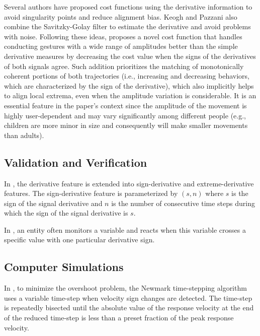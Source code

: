 \documentclass[11pt]{book}
\begin{document}
Several authors have proposed cost functions using the derivative
information to avoid singularity points and reduce alignment bias.
Keogh and Pazzani also combine the Savitzky-Golay filter to estimate
the derivative and avoid problems with noise. Following these ideas,
\cite{schramm2014dynamic} proposes a novel cost function that handles
conducting gestures with a wide range of amplitudes better than the
simple derivative measures by decreasing the cost value when the signs
of the derivatives of both signals agree. Such addition prioritizes
the matching of monotonically coherent portions of both trajectories
(i.e., increasing and decreasing behaviors, which are characterized
by the sign of the derivative), which also implicitly helps to align
local extrema, even when the amplitude variation is considerable.
It is an essential feature in the paper's context since the amplitude
of the movement is highly user-dependent and may vary significantly
among different people (e.g., children are more minor in size and
consequently will make smaller movements than adults).


\subsection{Validation and Verification}

In \cite{matinnejad2016automated}, the derivative feature is extended
into sign-derivative and extreme-derivative features. The sign-derivative
feature is parameterized by $\left(s,n\right)$ where $s$ is the
sign of the signal derivative and $n$ is the number of consecutive
time steps during which the sign of the signal derivative is $s$.

In \cite{deantoni2018towards}, an entity often monitors a variable
and reacts when this variable crosses a specific value with one particular
derivative sign.


\subsection{Computer Simulations}

In \cite{sjoberg2003probabilistic}, to minimize the overshoot problem,
the Newmark time-stepping algorithm uses a variable time-step when
velocity sign changes are detected. The time-step is repeatedly bisected
until the absolute value of the response velocity at the end of the
reduced time-step is less than a preset fraction of the peak response
velocity.
\end{document}
